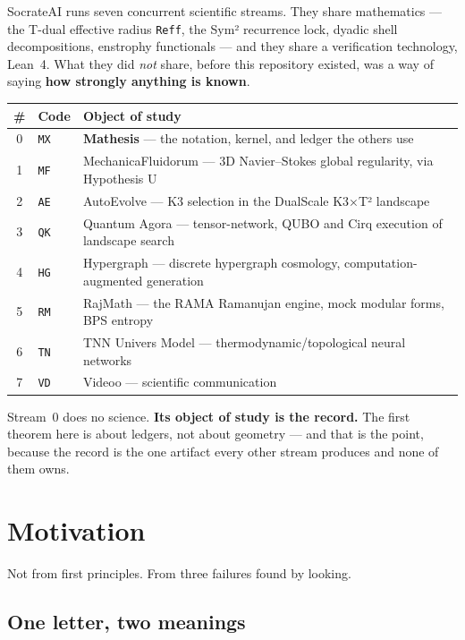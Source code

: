 \documentclass[11pt,a4paper]{article}
\begin{document}
SocrateAI runs seven concurrent scientific streams. They share mathematics — the T-dual
effective radius \texttt{Reff}, the Sym² recurrence lock, dyadic shell decompositions,
enstrophy functionals — and they share a verification technology, Lean~4. What they did
\emph{not} share, before this repository existed, was a way of saying \textbf{how strongly
anything is known}.

\begin{center}\small
\begin{tabular}{@{}clp{9.6cm}@{}}
\toprule
\# & Code & Object of study \\
\midrule
0 & \texttt{MX} & \textbf{Mathesis} — the notation, kernel, and ledger the others use \\
1 & \texttt{MF} & MechanicaFluidorum — 3D Navier–Stokes global regularity, via Hypothesis U \\
2 & \texttt{AE} & AutoEvolve — K3 selection in the DualScale K3×T² landscape \\
3 & \texttt{QK} & Quantum Agora — tensor-network, QUBO and Cirq execution of landscape search \\
4 & \texttt{HG} & Hypergraph — discrete hypergraph cosmology, computation-augmented generation \\
5 & \texttt{RM} & RajMath — the RAMA Ramanujan engine, mock modular forms, BPS entropy \\
6 & \texttt{TN} & TNN Univers Model — thermodynamic/topological neural networks \\
7 & \texttt{VD} & Videoo — scientific communication \\
\bottomrule
\end{tabular}
\end{center}

Stream~0 does no science. \textbf{Its object of study is the record.} The first theorem here is
about ledgers, not about geometry — and that is the point, because the record is the one
artifact every other stream produces and none of them owns.

\section{Motivation}

Not from first principles. From three failures found by looking.

\subsection{One letter, two meanings}
\end{document}
